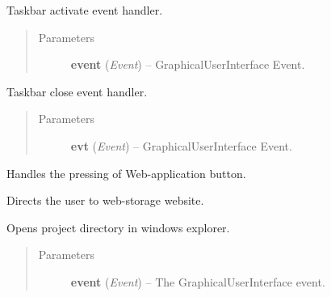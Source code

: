\documentclass[letterpaper,10pt,english]{sphinxmanual}
\begin{document}
\begin{fulllineitems}
\begin{fulllineitems}
\end{fulllineitems}


\begin{fulllineitems}
\label{diwacs:diwacs.GraphicalUserInterface.OnTaskBarActivate}
Taskbar activate event handler.
\begin{quote}\begin{description}
\item[{Parameters}] \leavevmode
\textbf{event} (\emph{Event}) -- GraphicalUserInterface Event.

\end{description}\end{quote}

\end{fulllineitems}


\begin{fulllineitems}
\label{diwacs:diwacs.GraphicalUserInterface.OnTaskBarClose}
Taskbar close event handler.
\begin{quote}\begin{description}
\item[{Parameters}] \leavevmode
\textbf{evt} (\emph{Event}) -- GraphicalUserInterface Event.

\end{description}\end{quote}

\end{fulllineitems}


\begin{fulllineitems}
\label{diwacs:diwacs.GraphicalUserInterface.OnWABtn}
Handles the pressing of Web-application button.

Directs the user to web-storage website.

\end{fulllineitems}


\begin{fulllineitems}
\label{diwacs:diwacs.GraphicalUserInterface.OpenProjectDir}
Opens project directory in windows explorer.
\begin{quote}\begin{description}
\item[{Parameters}] \leavevmode
\textbf{event} (\emph{Event}) -- The GraphicalUserInterface event.


\end{description}
\end{quote}
\end{fulllineitems}
\end{fulllineitems}
\end{document}
